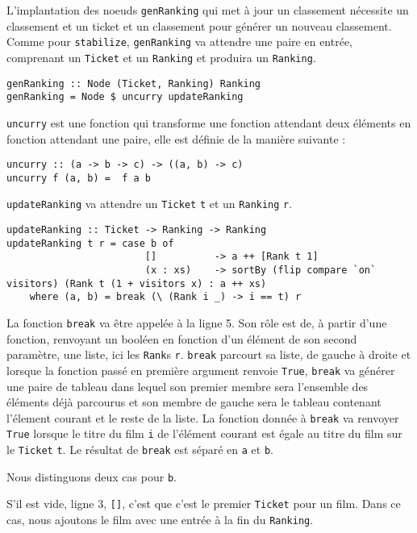 \documentclass{llncs}
\begin{document}
L'implantation des noeuds \lstinline{genRanking} qui met à jour un classement
nécessite un classement et un ticket et un classement pour générer un nouveau classement.
Comme pour \lstinline{stabilize}, \lstinline{genRanking} va attendre une paire en
entrée, comprenant un \lstinline{Ticket} et un \lstinline{Ranking} et produira
un \lstinline{Ranking}.
\begin{lstlisting}
genRanking :: Node (Ticket, Ranking) Ranking
genRanking = Node $ uncurry updateRanking
\end{lstlisting}
\lstinline{uncurry} est une fonction qui transforme une fonction attendant deux éléments
en fonction attendant une paire, elle est définie de la manière suivante :
\begin{lstlisting}
uncurry :: (a -> b -> c) -> ((a, b) -> c)
uncurry f (a, b) =  f a b
\end{lstlisting}

\lstinline{updateRanking} va attendre un \lstinline{Ticket} \lstinline{t} et un
\lstinline{Ranking} \lstinline{r}.
\begin{lstlisting}
updateRanking :: Ticket -> Ranking -> Ranking
updateRanking t r = case b of
                        []          -> a ++ [Rank t 1]
                        (x : xs)    -> sortBy (flip compare `on` visitors) (Rank t (1 + visitors x) : a ++ xs)
    where (a, b) = break (\ (Rank i _) -> i == t) r
\end{lstlisting}
La fonction \lstinline{break} va être appelée à la ligne 5.
Son rôle est de, à partir d'une fonction, renvoyant un booléen en fonction d'un
élément de son second paramètre, une liste, ici les \lstinline{Rank}s \lstinline{r}.
\lstinline{break} parcourt sa liste, de gauche à droite et lorsque la fonction passé
en première argument renvoie \lstinline{True}, \lstinline{break} va générer une
paire de tableau dans lequel son premier membre sera l'ensemble des éléments déjà
parcourus et son membre de gauche sera le tableau contenant l'élement courant et
le reste de la liste.
La fonction donnée à \lstinline{break} va renvoyer \lstinline{True} lorsque le titre
du film \lstinline{i} de l'élément courant est égale au titre du film sur le
\lstinline{Ticket} \lstinline{t}.
Le résultat de \lstinline{break} est séparé en \lstinline{a} et \lstinline{b}.

Nous distinguons deux cas pour \lstinline{b}.

S'il est vide, ligne 3, \lstinline{[]}, c'est que c'est le premier \lstinline{Ticket}
pour un film.
Dans ce cas, nous ajoutons le film avec une entrée à la fin du \lstinline{Ranking}.
\end{document}
